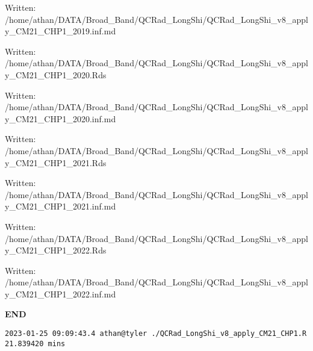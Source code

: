 \documentclass[
  10pt,
  a4paper,oneside]{article}
\begin{document}
Written: /home/athan/DATA/Broad\_Band/QCRad\_LongShi/QCRad\_LongShi\_v8\_apply\_CM21\_CHP1\_2019.inf.md

Written: /home/athan/DATA/Broad\_Band/QCRad\_LongShi/QCRad\_LongShi\_v8\_apply\_CM21\_CHP1\_2020.Rds

Written: /home/athan/DATA/Broad\_Band/QCRad\_LongShi/QCRad\_LongShi\_v8\_apply\_CM21\_CHP1\_2020.inf.md

Written: /home/athan/DATA/Broad\_Band/QCRad\_LongShi/QCRad\_LongShi\_v8\_apply\_CM21\_CHP1\_2021.Rds

Written: /home/athan/DATA/Broad\_Band/QCRad\_LongShi/QCRad\_LongShi\_v8\_apply\_CM21\_CHP1\_2021.inf.md

Written: /home/athan/DATA/Broad\_Band/QCRad\_LongShi/QCRad\_LongShi\_v8\_apply\_CM21\_CHP1\_2022.Rds

Written: /home/athan/DATA/Broad\_Band/QCRad\_LongShi/QCRad\_LongShi\_v8\_apply\_CM21\_CHP1\_2022.inf.md

\textbf{END}

\begin{verbatim}
2023-01-25 09:09:43.4 athan@tyler ./QCRad_LongShi_v8_apply_CM21_CHP1.R 21.839420 mins
\end{verbatim}
\end{document}
